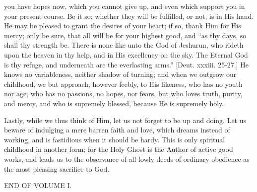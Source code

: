 you have hopes now, which you cannot give up, and even
which support you in your present course. Be it so;
whether they will be fulfilled, or not, is in His hand.
He may be pleased to grant the desires of your heart; if
so, thank Him for His mercy; only be sure, that all will
be for your highest good, and ``as thy days, so shall
thy strength be. There is none like unto the God of
Jeshurun, who rideth upon the heaven in thy help, and in
His excellency on the sky. The Eternal God is thy refuge,
and underneath are the everlasting arms.'' [Deut.
xxxiii. 25-27.] He knows no variableness, neither shadow
of turning; and when we outgrow our childhood, we but
approach, however feebly, to His likeness, who has no
youth nor age, who has no passions, no hopes, nor fears,
but who loves truth, purity, and mercy, and who is
supremely blessed, because He is supremely holy.

Lastly, while we thus think of Him, let us not forget
to be up and doing. Let us beware of indulging a mere
barren faith and love, which dreams instead of working,
and is fastidious when it should be hardy. This is only
spiritual childhood in another form; for the Holy Ghost
is the Author of active good works, and leads us to the
observance of all lowly deeds of ordinary obedience as
the most pleasing sacrifice to God.

END OF VOLUME I.
